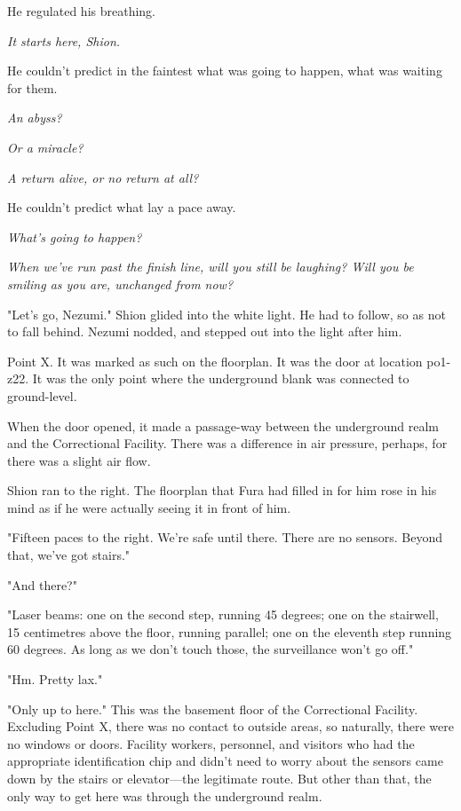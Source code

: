 He regulated his breathing.

\emph{It starts here, Shion.}

He couldn't predict in the faintest what was going to happen, what was
waiting for them.

\emph{An abyss?}

\emph{Or a miracle?}

\emph{A return alive, or no return at all?}

He couldn't predict what lay a pace away.

\emph{What's going to happen\el ?}

\emph{When we've run past the finish line, will you still be laughing? Will
you be smiling as you are, unchanged from now?}

"Let's go, Nezumi." Shion glided into the white light. He had to follow,
so as not to fall behind. Nezumi nodded, and stepped out into the light
after him.

Point X. It was marked as such on the floorplan. It was the door at
location po1-z22. It was the only point where the underground blank was
connected to ground-level.

When the door opened, it made a passage-way between the underground
realm and the Correctional Facility. There was a difference in air
pressure, perhaps, for there was a slight air flow.

Shion ran to the right. The floorplan that Fura had filled in for him
rose in his mind as if he were actually seeing it in front of him.

"Fifteen paces to the right. We're safe until there. There are no
sensors. Beyond that, we've got stairs."

"And there?"

"Laser beams: one on the second step, running 45 degrees; one on the
stairwell, 15 centimetres above the floor, running parallel; one on the
eleventh step running 60 degrees. As long as we don't touch those, the
surveillance won't go off."

"Hm. Pretty lax."

"Only up to here." This was the basement floor of the Correctional
Facility. Excluding Point X, there was no contact to outside areas, so
naturally, there were no windows or doors. Facility workers, personnel,
and visitors who had the appropriate identification chip and didn't need
to worry about the sensors came down by the stairs or elevator---the
legitimate route. But other than that, the only way to get here was
through the underground realm.

